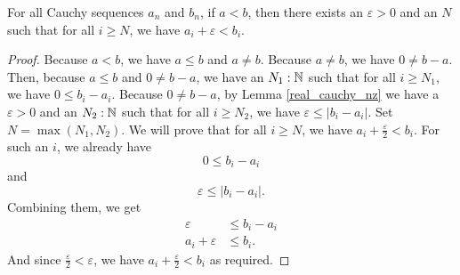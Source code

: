 \documentclass[../../math.tex]{subfiles}
\begin{document}
\begin{lemma} \label{real_lt}
    For all Cauchy sequences $a_n$ and $b_n$, if $a < b$, then there exists an
    $\varepsilon > 0$ and an $N$ such that for all $i \geq N$, we have $a_i +
    \varepsilon < b_i$.
\end{lemma}
\begin{proof}
    Because $a < b$, we have $a \leq b$ and $a \neq b$.  Because $a \neq b$, we
    have $0 \neq b - a$.  Then, because $a \leq b$ and $0 \neq b - a$, we have
    an $N_1 : \mathbb{N}$ such that for all $i \geq N_1$, we have $0 \leq b_i - a_i$.
    Because $0 \neq b - a$, by Lemma \ref{real_cauchy_nz} we have a $\varepsilon
    > 0$ and an $N_2 : \mathbb{N}$ such that for all $i \geq N_2$, we have $\varepsilon
    \leq |b_i - a_i|$.  Set $N = \max(N_1, N_2)$.  We will prove that for all $i
    \geq N$, we have $a_i + \frac{\varepsilon}{2} < b_i$.  For such an $i$, we
    already have
    \[
        0 \leq b_i - a_i
    \]
    and
    \[
        \varepsilon \leq |b_i - a_i|.
    \]
    Combining them, we get
    \begin{align*}
        \varepsilon &\leq b_i - a_i \\
        a_i + \varepsilon &\leq b_i.
    \end{align*}
    And since $\frac{\varepsilon}{2} < \varepsilon$, we have $a_i +
    \frac{\varepsilon}{2} < b_i$ as required.
\end{proof}
\end{document}
